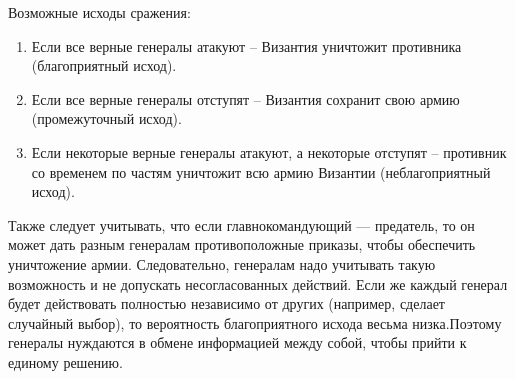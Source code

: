 Возможные исходы сражения:
\begin{enumerate}
\item Если все верные генералы атакуют -- Византия уничтожит противника (благоприятный исход).
\item Если все верные генералы отступят -- Византия сохранит свою армию (промежуточный исход).
\item Если некоторые верные генералы атакуют, а некоторые отступят -- противник со временем по частям уничтожит всю армию Византии (неблагоприятный исход).
\end{enumerate}
   
Также следует учитывать, что если главнокомандующий — предатель, то он может дать разным генералам противоположные приказы, чтобы обеспечить уничтожение армии. Следовательно, генералам надо учитывать такую возможность и не допускать несогласованных действий. Если же каждый генерал будет действовать полностью независимо от других (например, сделает случайный выбор), то вероятность благоприятного исхода весьма низка.Поэтому генералы нуждаются в обмене информацией между собой, чтобы прийти к единому решению. 